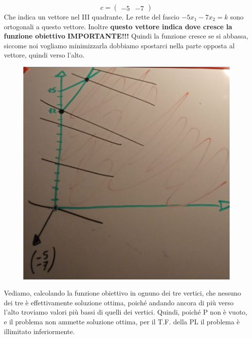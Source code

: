 \begin{equation*}
    c = \begin{pmatrix}
        -5 & -7
    \end{pmatrix}
\end{equation*}
Che indica un vettore nel III quadrante. Le rette del fascio $-5x_1 -7x_2 = k$ sono ortogonali a questo vettore. Inoltre \textbf{questo vettore indica dove cresce la funzione obiettivo} \textbf{IMPORTANTE!!!} Quindi la funzione cresce se si abbassa, siccome noi vogliamo minimizzarla dobbiamo spostarci nella parte opposta al vettore, quindi verso l'alto.
\begin{figure}[h!]
    \centering
    \includegraphics[scale=0.3]{WhatsAppImage2021-10-18at00.03.51.jpeg}
\end{figure}
Vediamo, calcolando la funzione obiettivo in ognuno dei tre vertici, che nessuno dei tre è effettivamente soluzione ottima, poiché andando ancora di più verso l'alto troviamo valori più bassi di quelli dei vertici. Quindi, poiché P non è vuoto, e il problema non ammette soluzione ottima, per il T.F. della PL il problema è illimitato inferiormente.


\newpage


